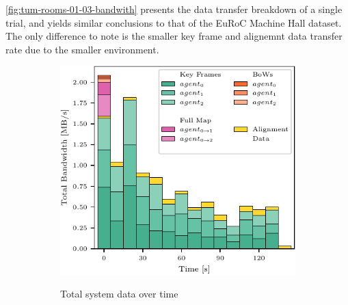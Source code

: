 \autoref{fig:tum-rooms-01-03-bandwith} presents the data transfer breakdown of a single trial, and yields similar conclusions to that of the EuRoC Machine Hall dataset. The only difference to note is the smaller key frame and alignemnt data transfer rate due to the smaller environment.

\begin{figure}[h]
    \centering
    \begin{subfigure}[b]{0.55\linewidth}
        \centering
         {
            \includegraphics[width=\linewidth, valign=t]{figures/apr11_tum_room_trajectory_a_bandwith.pdf}
        }
        \caption{Total system data over time}
    \end{subfigure}%
    ~
    \begin{subfigure}[b]{0.45\linewidth}
        \flushright
\end{subfigure}
\end{figure}
